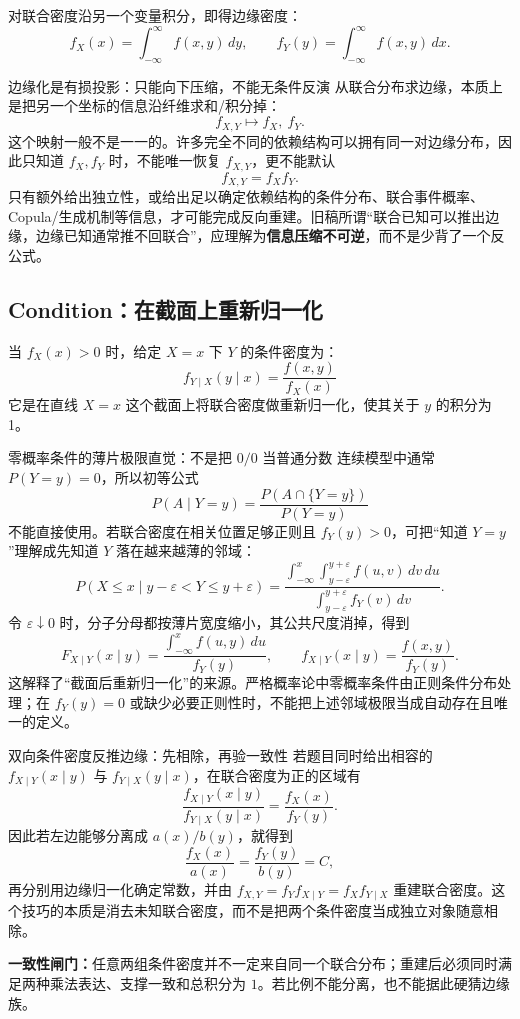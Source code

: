 \documentclass[11pt,a4paper]{ctexart}
\newcommand{\kw}[1]{\textbf{\color{deep}#1}}
\begin{document}
对联合密度沿另一个变量积分，即得边缘密度：
\[
f_X(x) = \int_{-\infty}^\infty f(x,y) \, dy,\qquad f_Y(y) = \int_{-\infty}^\infty f(x,y) \, dx.
\]

\begin{methodbox}{边缘化是有损投影：只能向下压缩，不能无条件反演}
从联合分布求边缘，本质上是把另一个坐标的信息沿纤维求和/积分掉：
\[
f_{X,Y}\longmapsto f_X,\ f_Y.
\]
这个映射一般不是一一的。许多完全不同的依赖结构可以拥有同一对边缘分布，因此只知道 $f_X,f_Y$ 时，不能唯一恢复 $f_{X,Y}$，更不能默认
\[
f_{X,Y}=f_Xf_Y.
\]
只有额外给出独立性，或给出足以确定依赖结构的条件分布、联合事件概率、Copula/生成机制等信息，才可能完成反向重建。旧稿所谓“联合已知可以推出边缘，边缘已知通常推不回联合”，应理解为\kw{信息压缩不可逆}，而不是少背了一个反公式。
\end{methodbox}

\subsection{Condition：在截面上重新归一化}

当 $f_X(x) > 0$ 时，给定 $X=x$ 下 $Y$ 的条件密度为：
\[
\boxed{
f_{Y\mid X}(y\mid x) = \frac{f(x,y)}{f_X(x)}
}
\]
它是在直线 $X=x$ 这个截面上将联合密度做重新归一化，使其关于 $y$ 的积分为 1。

\begin{methodbox}{零概率条件的薄片极限直觉：不是把 $0/0$ 当普通分数}
连续模型中通常 $P(Y=y)=0$，所以初等公式
\[
P(A\mid Y=y)=\frac{P(A\cap\{Y=y\})}{P(Y=y)}
\]
不能直接使用。若联合密度在相关位置足够正则且 $f_Y(y)>0$，可把“知道 $Y=y$”理解成先知道 $Y$ 落在越来越薄的邻域：
\[
P(X\le x\mid y-\varepsilon<Y\le y+\varepsilon)
=\frac{\displaystyle\int_{-\infty}^{x}\int_{y-\varepsilon}^{y+\varepsilon}f(u,v)\,dv\,du}
{\displaystyle\int_{y-\varepsilon}^{y+\varepsilon}f_Y(v)\,dv}.
\]
令 $\varepsilon\downarrow0$ 时，分子分母都按薄片宽度缩小，其公共尺度消掉，得到
\[
F_{X\mid Y}(x\mid y)=\frac{\displaystyle\int_{-\infty}^{x}f(u,y)\,du}{f_Y(y)},
\qquad
f_{X\mid Y}(x\mid y)=\frac{f(x,y)}{f_Y(y)}.
\]
这解释了“截面后重新归一化”的来源。严格概率论中零概率条件由正则条件分布处理；在 $f_Y(y)=0$ 或缺少必要正则性时，不能把上述邻域极限当成自动存在且唯一的定义。
\end{methodbox}

\begin{methodbox}{双向条件密度反推边缘：先相除，再验一致性}
若题目同时给出相容的 $f_{X\mid Y}(x\mid y)$ 与 $f_{Y\mid X}(y\mid x)$，在联合密度为正的区域有
\[
\frac{f_{X\mid Y}(x\mid y)}{f_{Y\mid X}(y\mid x)}
=\frac{f_X(x)}{f_Y(y)}.
\]
因此若左边能够分离成 $a(x)/b(y)$，就得到
\[
\frac{f_X(x)}{a(x)}=\frac{f_Y(y)}{b(y)}=C,
\]
再分别用边缘归一化确定常数，并由 $f_{X,Y}=f_Yf_{X\mid Y}=f_Xf_{Y\mid X}$ 重建联合密度。这个技巧的本质是消去未知联合密度，而不是把两个条件密度当成独立对象随意相除。

\textbf{一致性闸门：}任意两组条件密度并不一定来自同一个联合分布；重建后必须同时满足两种乘法表达、支撑一致和总积分为 $1$。若比例不能分离，也不能据此硬猜边缘族。
\end{methodbox}
\end{document}
